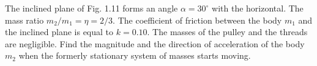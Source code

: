 
\item The inclined plane of Fig. 1.11 forms an angle \(\alpha = 30^\circ\) with the horizontal. The mass ratio \( m_2/m_1 = \eta = 2/3 \). The coefficient of friction between the body \( m_1 \) and the inclined plane is equal to \( k = 0.10 \). The masses of the pulley and the threads are negligible. Find the magnitude and the direction of acceleration of the body \( m_2 \) when the formerly stationary system of masses starts moving.
    \begin{center}
    \end{center}
